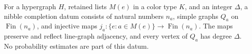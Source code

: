 \begin{definition}
For a hypergraph $H$, retained lists $M(e)$ in a color type $K$, and an
integer $\Delta$, a nibble completion datum consists of natural numbers
$n_a$, simple graphs $Q_a$ on $\operatorname{Fin}(n_a)$, and injective maps
$j_a:\{e:a\in M(e)\}\to\operatorname{Fin}(n_a)$.
The maps preserve and reflect line-graph adjacency, and every vertex of
$Q_a$ has degree $\Delta$. No probability estimates are part of this datum.
\end{definition}
